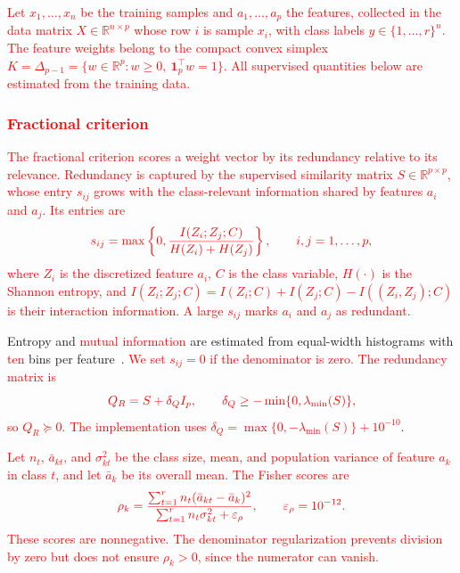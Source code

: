 \documentclass[]{interact}
\theoremstyle{plain}
\theoremstyle{definition}
\theoremstyle{remark}
\newcommand{\R}{\mathbb{R}}
\begin{document}
\leavevmode\textcolor{red}{Let $x_1,\ldots,x_n$ be the training samples and $a_1,\ldots,a_p$ the features, collected in the data matrix $X\in\R^{n\times p}$ whose row $i$ is sample $x_i$, with class labels $y\in\{1,\ldots,r\}^n$. The feature weights belong to the compact convex simplex $K=\Delta_{p-1}=\{w\in\R^p:w\ge0,\ \mathbf1_p^{\top}w=1\}$. All supervised quantities below are estimated from the training data.}

\subsubsection{\textcolor{red}{Fractional criterion}}\label{ssec:wang}\label{sssec:wang-inputs}\label{sssec:nfscore}
\leavevmode\textcolor{red}{The fractional criterion scores a weight vector by its redundancy relative to its relevance. Redundancy is captured by the supervised similarity matrix $S\in\R^{p\times p}$, whose entry $s_{ij}$ grows with the class-relevant information shared by features $a_i$ and $a_j$. Its entries are}
\begin{equation}\label{eq:simMI}\textcolor{red}{
s_{ij}=\max\left\{0,\frac{I(Z_i;Z_j;C)}{H(Z_i)+H(Z_j)}\right\},\qquad i,j=1,\ldots,p,
}\end{equation}
\leavevmode\textcolor{red}{where $Z_i$ is the discretized feature $a_i$, $C$ is the class variable, $H(\cdot)$ is the Shannon entropy, and $I(Z_i;Z_j;C)=I(Z_i;C)+I(Z_j;C)-I((Z_i,Z_j);C)$ is their interaction information. A large $s_{ij}$ marks $a_i$ and $a_j$ as redundant.}

Entropy and \leavevmode\textcolor{red}{mutual information} are estimated from equal-width histograms with \leavevmode\textcolor{red}{ten} bins per feature~\citep{brown2012}. \leavevmode\textcolor{red}{We set $s_{ij}=0$ if the denominator is zero. The redundancy matrix is}
\begin{equation}\label{eq:matrixQ}\textcolor{red}{
Q_R=S+\delta_QI_p,\qquad \delta_Q\ge-\min\{0,\lambda_{\min}(S)\},
}\end{equation}
\leavevmode\textcolor{red}{so $Q_R\succeq0$. The implementation uses $\delta_Q=\max\{0,-\lambda_{\min}(S)\}+10^{-10}$}.

\leavevmode\textcolor{red}{Let $n_t$, $\bar a_{kt}$, and $\sigma_{kt}^2$ be the class size, mean, and population variance of feature $a_k$ in class $t$, and let $\bar a_k$ be its overall mean. The Fisher scores are}
\begin{equation}\label{eq:rhoFisher}\textcolor{red}{
\rho_k=\frac{\sum_{t=1}^r n_t(\bar a_{kt}-\bar a_k)^2}{\sum_{t=1}^r n_t\sigma_{kt}^2+\varepsilon_\rho},\qquad \varepsilon_\rho=10^{-12}.
}\end{equation}
\leavevmode\textcolor{red}{These scores are nonnegative. The denominator regularization prevents division by zero but does not ensure $\rho_k>0$, since the numerator can vanish.}
\end{document}
